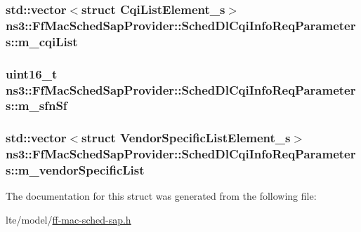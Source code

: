 \subsubsection[{\texorpdfstring{m\+\_\+cqi\+List}{m_cqiList}}]{\setlength{\rightskip}{0pt plus 5cm}std\+::vector$<$struct {\bf Cqi\+List\+Element\+\_\+s}$>$ ns3\+::\+Ff\+Mac\+Sched\+Sap\+Provider\+::\+Sched\+Dl\+Cqi\+Info\+Req\+Parameters\+::m\+\_\+cqi\+List}\hypertarget{structns3_1_1FfMacSchedSapProvider_1_1SchedDlCqiInfoReqParameters_a6f675261f1775ecb5137468be95c0b01}{}\label{structns3_1_1FfMacSchedSapProvider_1_1SchedDlCqiInfoReqParameters_a6f675261f1775ecb5137468be95c0b01}
\subsubsection[{\texorpdfstring{m\+\_\+sfn\+Sf}{m_sfnSf}}]{\setlength{\rightskip}{0pt plus 5cm}uint16\+\_\+t ns3\+::\+Ff\+Mac\+Sched\+Sap\+Provider\+::\+Sched\+Dl\+Cqi\+Info\+Req\+Parameters\+::m\+\_\+sfn\+Sf}\hypertarget{structns3_1_1FfMacSchedSapProvider_1_1SchedDlCqiInfoReqParameters_ab3e920b00fef256c039da9a45b16bb4a}{}\label{structns3_1_1FfMacSchedSapProvider_1_1SchedDlCqiInfoReqParameters_ab3e920b00fef256c039da9a45b16bb4a}
\subsubsection[{\texorpdfstring{m\+\_\+vendor\+Specific\+List}{m_vendorSpecificList}}]{\setlength{\rightskip}{0pt plus 5cm}std\+::vector$<$struct {\bf Vendor\+Specific\+List\+Element\+\_\+s}$>$ ns3\+::\+Ff\+Mac\+Sched\+Sap\+Provider\+::\+Sched\+Dl\+Cqi\+Info\+Req\+Parameters\+::m\+\_\+vendor\+Specific\+List}\hypertarget{structns3_1_1FfMacSchedSapProvider_1_1SchedDlCqiInfoReqParameters_a8b5f3037c90dc41ffaa634c897d84d13}{}\label{structns3_1_1FfMacSchedSapProvider_1_1SchedDlCqiInfoReqParameters_a8b5f3037c90dc41ffaa634c897d84d13}


The documentation for this struct was generated from the following file\+:\begin{DoxyCompactItemize}
\item 
lte/model/\hyperlink{ff-mac-sched-sap_8h}{ff-\/mac-\/sched-\/sap.\+h}\end{DoxyCompactItemize}
